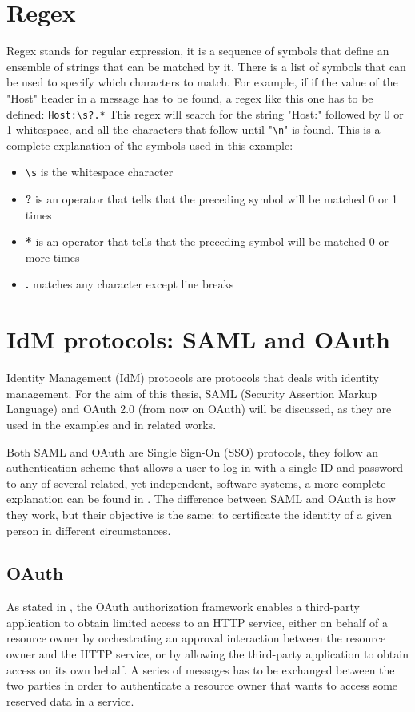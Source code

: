 \section{Regex}
Regex stands for regular expression, it is a sequence of symbols that define an ensemble of strings that can be matched by it. There is a list of symbols that can be used to specify which characters to match. For example, if if the value of the "Host" header in a message has to be found, a regex like this one has to be defined: \verb|Host:\s?.*|
This regex will search for the string "Host:" followed by 0 or 1 whitespace, and all the characters that follow until "\verb|\n|" is found. This is a complete explanation of the symbols used in this example:
\begin{itemize}
    \item \verb|\s| is the whitespace character
    \item \textbf{?} is an operator that tells that the preceding symbol will be matched 0 or 1 times
    \item \textbf{*} is an operator that tells that the preceding symbol will be matched 0 or more times
    \item \textbf{.} matches any character except line breaks
\end{itemize}

\section{IdM protocols: SAML and OAuth}
Identity Management (IdM) protocols are protocols that deals with identity management. For the aim of this thesis, \gls{SAML} (Security Assertion Markup Language) and \Gls{OAuth} 2.0 (from now on \Gls{OAuth}) will be discussed, as they are used in the examples and in related works.

Both \Gls{SAML} and \Gls{OAuth} are Single Sign-On (SSO) protocols, they follow an authentication scheme that allows a user to log in with a single ID and password to any of several related, yet independent, software systems, a more complete explanation can be found in \cite{claudio_grisenti}. 
The difference between \Gls{SAML} and \Gls{OAuth} is how they work, but their objective is the same: to certificate the identity of a given person in different circumstances.

\subsection{OAuth}
As stated in \cite{ietf_oauth2}, the \Gls{OAuth} authorization framework enables a third-party application to obtain limited access to an HTTP service, either on behalf of a resource owner by orchestrating an approval interaction between the resource owner and the HTTP service, or by allowing the third-party application to obtain access on its own behalf.
A series of messages has to be exchanged between the two parties in order to authenticate a resource owner that wants to access some reserved data in a service.

